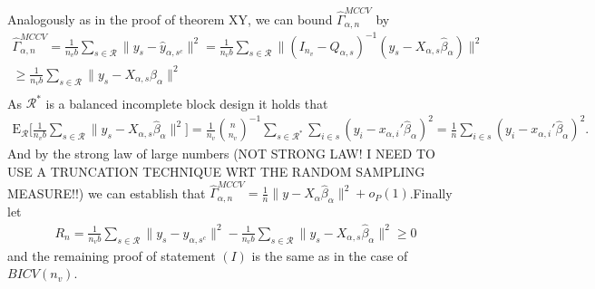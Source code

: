 \documentclass[Research_Module_ES.tex]{subfiles}
\begin{document}
Analogously as in the proof of theorem XY, we can bound $\hat{\Gamma}_{\alpha,n}^{MCCV}$ by
\begin{align*}
\hat{\Gamma}_{\alpha,n}^{MCCV}= \frac{1}{n_vb}\sum_{s\in \mathcal{R}}\lVert y_s-\hat{y}_{\alpha,s^c}\rVert^2
= \frac{1}{n_vb}\sum_{s\in \mathcal{R}}\lVert (I_{n_v}-Q_{\alpha,s})^{-1}(y_s-X_{\alpha,s}\hat{\beta}_\alpha)\rVert^2\\
\ge \frac{1}{n_vb}\sum_{s\in \mathcal{R}}\lVert y_s-X_{\alpha,s}\hat{\beta}_\alpha\rVert^2\\
\end{align*}
As $\mathcal{R}^\ast$ is a balanced incomplete block design it holds that
\begin{align*}
\mathrm{E}_\mathcal{R} \biggl[\frac{1}{n_vb}\sum_{s\in \mathcal{R}}\lVert y_s-X_{\alpha,s}\hat{\beta}_\alpha\rVert^2 \biggr] 
= \frac{1}{n_v}\binom{n}{n_v}^{-1}\sum_{s\in \mathcal{R}^\ast}\sum_{i\in s}(y_i-x_{\alpha,i}'\hat{\beta}_\alpha)^2
= \frac{1}{n}\sum_{i\in s}(y_i-x_{\alpha,i}'\hat{\beta}_\alpha)^2.
\end{align*}
And by the strong law of large numbers (NOT STRONG LAW! I NEED TO USE A TRUNCATION TECHNIQUE WRT THE RANDOM SAMPLING MEASURE!!)
we can establish that $\hat{\Gamma}_{\alpha,n}^{MCCV} = \frac{1}{n}\lVert y-X_{\alpha}\hat{\beta}_\alpha\rVert^2 + o_P(1)$.Finally let
\begin{align*}
R_n= \frac{1}{n_vb}\sum_{s\in \mathcal{R}}\lVert y_s-\hat{y}_{\alpha,s^c}\rVert^2- \frac{1}{n_vb}\sum_{s\in \mathcal{R}}\lVert y_s-X_{\alpha,s}\hat{\beta}_\alpha\rVert^2 \ge 0
\end{align*} 
and the remaining proof of statement $(I)$ is the same as in the case of $BICV(n_v)$.
\end{document}
